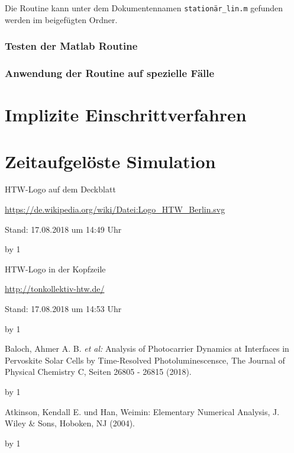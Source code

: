 \documentclass[
	pagesize,
	fontsize=12pt,
	paper=a4,
	oneside,
   reqno
]{scrartcl}
\begin{document}
Die Routine kann unter dem Dokumentennamen \texttt{stationär\_lin.m} gefunden werden im beigefügten Ordner.

\subsubsection{Testen der Matlab Routine}



\subsubsection{Anwendung der Routine auf spezielle Fälle}



\clearpage

\section{Implizite Einschrittverfahren} \label{sec:ImpliziteEinschrittverfahren}

\clearpage

\section{Zeitaufgelöste Simulation} \label{sec:ZeitaufgeloesteSimulation}

\clearpage

\newpage
\newcount\Quellennummer
{}

\renewcommand\refname{Literaturverzeichnis}

\begin{thebibliography}{999}
{\setlength{\emergencystretch}{3cm}%

HTW-Logo auf dem Deckblatt\par
\url{https://de.wikipedia.org/wiki/Datei:Logo_HTW_Berlin.svg} \par
 Stand: 17.08.2018 um 14:49 Uhr

\advance\Quellennummer by 1
 
HTW-Logo in der Kopfzeile\par
\url{http://tonkollektiv-htw.de/} \par
 Stand: 17.08.2018 um 14:53 Uhr

\advance\Quellennummer by 1

Baloch, Ahmer A. B. \textit{et al:} \glqq Analysis of Photocarrier Dynamics at Interfaces in Pervoskite Solar Cells by Time-Resolved Photoluminescensce\grqq{}, The Journal of Physical Chemistry C, Seiten 26805 - 26815 (2018).

\advance\Quellennummer by 1

Atkinson, Kendall E. und Han, Weimin: \glqq Elementary Numerical Analysis\grqq{}, J. Wiley \& Sons, Hoboken, NJ (2004).

\advance\Quellennummer by 1

}
\end{thebibliography}
\end{document}
